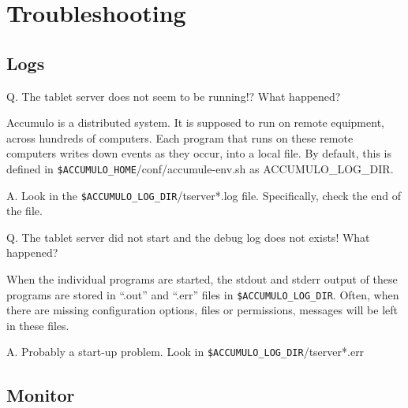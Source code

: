 
%
%

\chapter{Troubleshooting}

\section{Logs}

Q. The tablet server does not seem to be running!? What happened?

Accumulo is a distributed system.  It is supposed to run on remote
equipment, across hundreds of computers.  Each program that runs on
these remote computers writes down events as they occur, into a local
file. By default, this is defined in
\texttt{\$ACCUMULO\_HOME}/conf/accumule-env.sh as ACCUMULO\_LOG\_DIR.

A. Look in the \texttt{\$ACCUMULO\_LOG\_DIR}/tserver*.log file.  Specifically, check the end of the file.

Q. The tablet server did not start and the debug log does not exists!  What happened?

When the individual programs are started, the stdout and stderr output
of these programs are stored in ``.out'' and ``.err'' files in
\texttt{\$ACCUMULO\_LOG\_DIR}.  Often, when there are missing configuration
options, files or permissions, messages will be left in these files.

A. Probably a start-up problem.  Look in \texttt{\$ACCUMULO\_LOG\_DIR}/tserver*.err

\section{Monitor}


